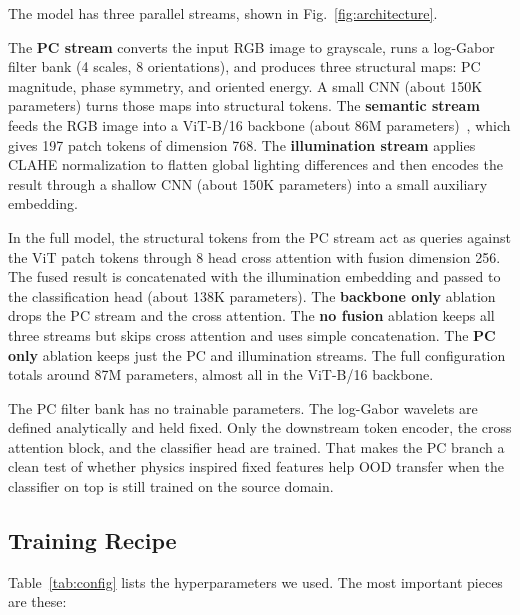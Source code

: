 \documentclass[conference]{IEEEtran}
\begin{document}
The model has three parallel streams, shown in Fig.~\ref{fig:architecture}.

The \textbf{PC stream} converts the input RGB image to grayscale, runs a log-Gabor filter bank (4 scales, 8 orientations), and produces three structural maps: PC magnitude, phase symmetry, and oriented energy. A small CNN (about 150K parameters) turns those maps into structural tokens. The \textbf{semantic stream} feeds the RGB image into a ViT-B/16 backbone (about 86M parameters)~\cite{Dosovitskiy2021}, which gives 197 patch tokens of dimension 768. The \textbf{illumination stream} applies CLAHE normalization to flatten global lighting differences and then encodes the result through a shallow CNN (about 150K parameters) into a small auxiliary embedding.

In the full model, the structural tokens from the PC stream act as queries against the ViT patch tokens through 8 head cross attention with fusion dimension 256. The fused result is concatenated with the illumination embedding and passed to the classification head (about 138K parameters). The \textbf{backbone only} ablation drops the PC stream and the cross attention. The \textbf{no fusion} ablation keeps all three streams but skips cross attention and uses simple concatenation. The \textbf{PC only} ablation keeps just the PC and illumination streams. The full configuration totals around 87M parameters, almost all in the ViT-B/16 backbone.

The PC filter bank has no trainable parameters. The log-Gabor wavelets are defined analytically and held fixed. Only the downstream token encoder, the cross attention block, and the classifier head are trained. That makes the PC branch a clean test of whether physics inspired fixed features help OOD transfer when the classifier on top is still trained on the source domain.

\subsection{Training Recipe}
\label{sec:recipe}

Table~\ref{tab:config} lists the hyperparameters we used. The most important pieces are these:
\end{document}
